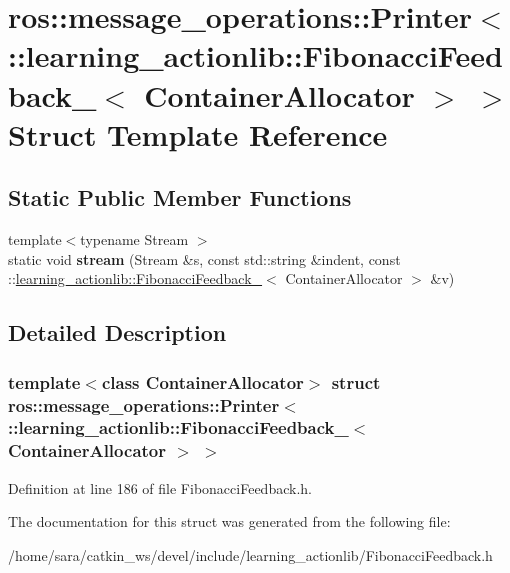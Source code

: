 \hypertarget{structros_1_1message__operations_1_1Printer_3_01_1_1learning__actionlib_1_1FibonacciFeedback___3_01ContainerAllocator_01_4_01_4}{}\section{ros\+:\+:message\+\_\+operations\+:\+:Printer$<$ \+:\+:learning\+\_\+actionlib\+:\+:Fibonacci\+Feedback\+\_\+$<$ Container\+Allocator $>$ $>$ Struct Template Reference}
\label{structros_1_1message__operations_1_1Printer_3_01_1_1learning__actionlib_1_1FibonacciFeedback___3_01ContainerAllocator_01_4_01_4}
\subsection*{Static Public Member Functions}
\begin{DoxyCompactItemize}
\item 
\mbox{\label{structros_1_1message__operations_1_1Printer_3_01_1_1learning__actionlib_1_1FibonacciFeedback___3_01ContainerAllocator_01_4_01_4_a869990684f9f09633fa3954a11c8c598}} 
{\footnotesize template$<$typename Stream $>$ }\\static void {\bfseries stream} (Stream \&s, const std\+::string \&indent, const \+::\hyperlink{structlearning__actionlib_1_1FibonacciFeedback__}{learning\+\_\+actionlib\+::\+Fibonacci\+Feedback\+\_\+}$<$ Container\+Allocator $>$ \&v)
\end{DoxyCompactItemize}


\subsection{Detailed Description}
\subsubsection*{template$<$class Container\+Allocator$>$\newline
struct ros\+::message\+\_\+operations\+::\+Printer$<$ \+::learning\+\_\+actionlib\+::\+Fibonacci\+Feedback\+\_\+$<$ Container\+Allocator $>$ $>$}



Definition at line 186 of file Fibonacci\+Feedback.\+h.



The documentation for this struct was generated from the following file\+:\begin{DoxyCompactItemize}
\item 
/home/sara/catkin\+\_\+ws/devel/include/learning\+\_\+actionlib/Fibonacci\+Feedback.\+h\end{DoxyCompactItemize}
